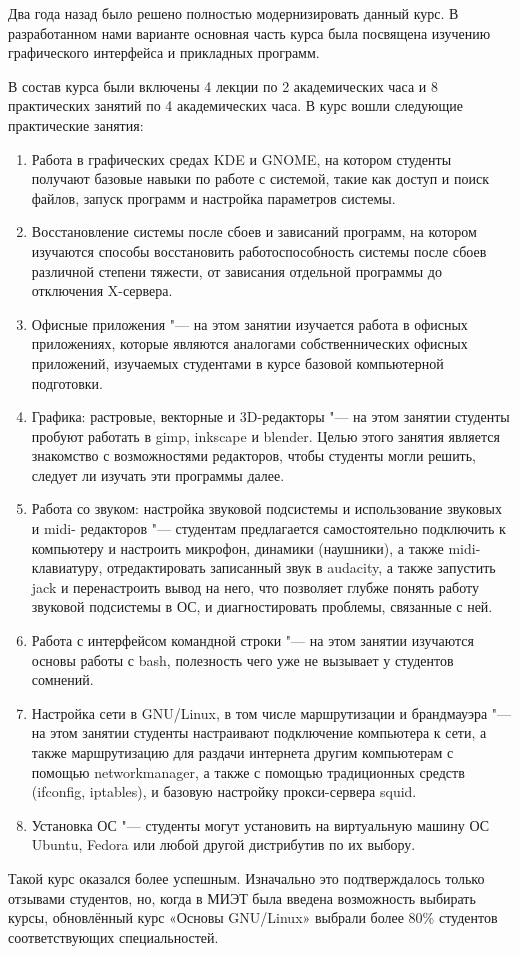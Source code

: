 \documentclass[10pt, a5paper]{article}
\begin{document}
Два года назад было решено полностью модернизировать данный курс. В разработанном нами варианте основная часть курса была посвящена изучению графического интерфейса и прикладных программ.

В состав курса были включены 4 лекции по 2 академических часа и 8 практических занятий по 4 академических часа. 
В курс вошли следующие практические занятия:

\begin{enumerate}
  \item Работа в графических средах KDE и GNOME, на котором студенты получают базовые навыки по работе с системой, такие как доступ и поиск файлов, запуск программ и настройка параметров системы.
  \item Восстановление системы после сбоев и зависаний программ, на котором изучаются способы восстановить работоспособность системы после сбоев различной степени тяжести, от зависания отдельной программы до отключения X-сервера.
  \item Офисные приложения "--- на этом занятии изучается работа в офисных приложениях, которые являются аналогами собственнических офисных приложений, изучаемых студентами в курсе базовой компьютерной подготовки.
  \item Графика: растровые, векторные и 3D-редакторы "--- на этом занятии студенты пробуют работать в gimp, inkscape и blender. Целью этого занятия является знакомство с возможностями редакторов, чтобы студенты могли решить, следует ли изучать эти программы далее.
  \item Работа со звуком: настройка звуковой подсистемы и использование звуковых и midi- редакторов "--- студентам предлагается самостоятельно подключить к компьютеру и настроить микрофон, динамики (наушники), а также midi-клавиатуру, отредактировать записанный звук в audacity, а также запустить jack и перенастроить вывод на него, что позволяет глубже понять работу звуковой подсистемы в ОС, и диагностировать проблемы, связанные с ней.
  \item Работа с интерфейсом командной строки "--- на этом занятии изучаются основы работы с bash, полезность чего уже не вызывает у студентов сомнений.
  \item Настройка сети в GNU/Linux, в том числе маршрутизации и брандмауэра "--- на этом занятии студенты настраивают подключение компьютера к сети, а также маршрутизацию для раздачи интернета другим компьютерам с помощью networkmanager, а также с помощью традиционных средств (ifconfig, iptables), и базовую настройку прокси-сервера squid.
  \item Установка ОС "--- студенты могут установить на виртуальную машину ОС Ubuntu, Fedora или любой другой дистрибутив по их выбору.
\end{enumerate}

Такой курс оказался более успешным. Изначально это подтверждалось только отзывами студентов, но, когда в МИЭТ была введена возможность выбирать курсы, обновлённый курс «Основы \linebreak GNU/Linux» выбрали более 80\% студентов соответствующих специальностей.
\end{document}
